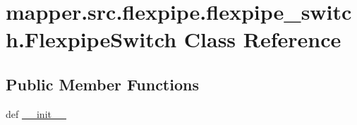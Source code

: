 \hypertarget{classmapper_1_1src_1_1flexpipe_1_1flexpipe__switch_1_1_flexpipe_switch}{}\section{mapper.\+src.\+flexpipe.\+flexpipe\+\_\+switch.\+Flexpipe\+Switch Class Reference}
\label{classmapper_1_1src_1_1flexpipe_1_1flexpipe__switch_1_1_flexpipe_switch}
\subsection*{Public Member Functions}
\begin{DoxyCompactItemize}
\item 
def \hyperlink{classmapper_1_1src_1_1flexpipe_1_1flexpipe__switch_1_1_flexpipe_switch_ab70be8b8a872a5103d593c4ee5af4a65}{\+\_\+\+\_\+init\+\_\+\+\_\+}
\end{DoxyCompactItemize}
